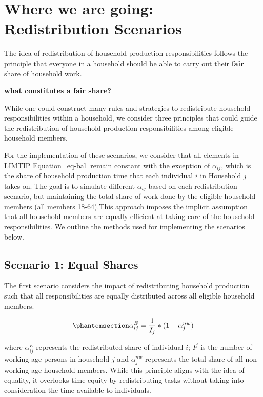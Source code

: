 \documentclass[
  11pt,
]{article}
\begin{document}
\section{Where we are going: Redistribution
Scenarios}\label{where-we-are-going-redistribution-scenarios}

The idea of redistribution of household production responsibilities
follows the principle that everyone in a household should be able to
carry out their \textbf{fair} share of household work.

\textbf{what constitutes a fair share?}

While one could construct many rules and strategies to redistribute
household responsibilities within a household, we consider three
principles that could guide the redistribution of household production
responsibilities among eligible household members.

For the implementation of these scenarios, we consider that all elements
in LIMTIP Equation~\ref{eq-bal} remain constant with the exception of
\(\alpha_{ij}\), which is the share of household production time that
each individual \(i\) in Household \(j\) takes on. The goal is to
simulate different \(\alpha_{ij}\) based on each redistribution
scenario, but maintaining the total share of work done by the eligible
household members (all members 18-64).This approach imposes the implicit
assumption that all household members are equally efficient at taking
care of the household responsibilities. We outline the methods used for
implementing the scenarios below.

\subsection{Scenario 1: Equal Shares}\label{scenario-1-equal-shares}

The first scenario considers the impact of redistributing household
production such that all responsibilities are equally distributed across
all eligible household members.

\begin{equation}\phantomsection\label{eq-r1}{\alpha_{ij}^E= \frac{1}{I_j}*(1-\alpha_{j}^{nw})
}\end{equation}

where \(\alpha_{ij}^E\) represents the redistributed share of individual
\(i\); \(I^j\) is the number of working-age persons in household \(j\)
and \(\alpha_{j}^{nw}\) represents the total share of all non-working
age household members. While this principle aligns with the idea of
equality, it overlooks time equity by redistributing tasks without
taking into consideration the time available to individuals.
\end{document}
